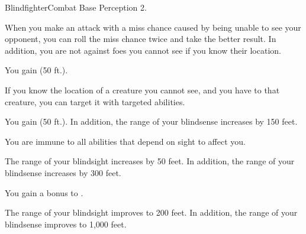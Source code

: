     \begin{feat}{Blindfighter}{Combat}
        \featpre Base Perception 2.

         When you make an attack with a miss chance caused by being unable to see your opponent, you can roll the miss chance twice and take the better result.
        In addition, you are not  against foes you cannot see if you know their location.

         You gain  (50 ft.).

         If you know the location of a creature you cannot see, and you have  to that creature, you can target it with targeted abilities.

         You gain  (50 ft.).
        In addition, the range of your blindsense increases by 150 feet.

         You are immune to all abilities that depend on sight to affect you.

         The range of your blindsight increases by 50 feet.
        In addition, the range of your blindsense increases by 300 feet.

         You gain a  bonus to .

         The range of your blindsight improves to 200 feet.
        In addition, the range of your blindsense improves to 1,000 feet.
    \end{feat}

